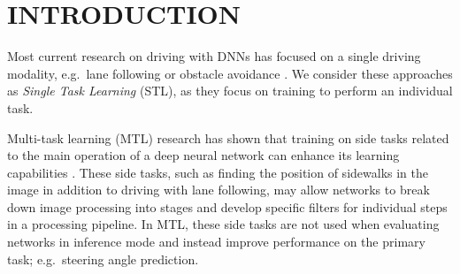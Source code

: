 


\section{INTRODUCTION}
\label{sec:intro}



Most current research on driving with DNNs has focused on a single driving modality, e.g.\ lane following or obstacle avoidance \cite{bojarski2016end,muller2006off,chen2015deepdriving,DBLP:journals/corr/HuvalWTKSPARMCM15}. We consider these approaches as \textit{Single Task Learning} (STL), as they focus on training to perform an individual task.

Multi-task learning (MTL) research has shown that training on side tasks related to the main operation of a deep neural network can enhance its learning capabilities \cite{caruana1998multitask, zhang2012convex, zhang2014facial, evgeniou2004regularized, argyriou2007multi}. These side tasks, such as finding the position of sidewalks in the image in addition to driving with lane following, may allow networks to break down image processing into stages and develop specific filters for individual steps in a processing pipeline. In MTL, these side tasks are not used when evaluating networks in inference mode and instead improve performance on the primary task; e.g.\ steering angle prediction.


